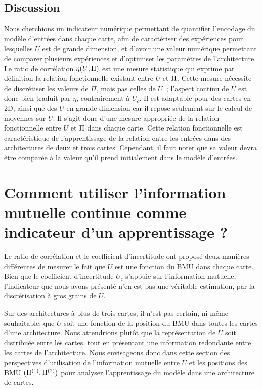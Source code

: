 \documentclass[../main]{subfiles}
\begin{document}
\subsection{Discussion}

Nous cherchions un indicateur numérique permettant de quantifier l'encodage du modèle d'entrées dans chaque carte, afin de caractériser des expériences pour lesquelles $U$ est de grande dimension, et d'avoir une valeur numérique permettant de comparer plusieurs expériences et d'optimiser les paramètres de l'architecture.
Le ratio de corrélation $\eta(U;\Pi)$ est une mesure statistique qui exprime par définition la relation fonctionnelle existant entre $U$ et $\Pi$. Cette mesure nécessite de discrétiser les valeurs de $\Pi$, mais pas celles de $U$~; l'aspect continu de $U$ est donc bien traduit par $\eta$, contrairement à $U_c$.
Il est adaptable pour des cartes en 2D, ainsi que des $U$ en grande dimension car il repose seulement sur le calcul de moyennes sur $U$.
Il s'agit donc d'une mesure appropriée de la relation fonctionnelle entre $U$ et $\Pi$ dans chaque carte.
Cette relation fonctionnelle est caractéristique de l'apprentissage de la relation entre les entrées dans des architectures de deux et trois cartes.
Cependant, il faut noter que sa valeur devra être comparée à la valeur qu'il prend initialement dans le modèle d'entrées.

\section{Comment utiliser l'information mutuelle continue comme indicateur d'un apprentissage ?}

Le ratio de corrélation et le coefficient d'incertitude ont proposé deux manières différentes de mesurer le fait que $U$ est une fonction du BMU dans chaque carte.
Bien que le coefficient d'incertitude $U_c$ s'appuie sur l'information mutuelle, l'indicateur que nous avons présenté n'en est pas une véritable estimation, par la discrétisation à gros grains de $U$.

Sur des architectures à plus de trois cartes, il n'est pas certain, ni même souhaitable, que $U$ soit une fonction de la position du BMU dans toutes les cartes d'une architecture. Nous attendrions plutôt que la représentation de $U$ soit distribuée entre les cartes, tout en présentant une information redondante entre les cartes de l'architecture.
Nous envisageons donc dans cette section des perspectives d'utilisation de l'information mutuelle entre $U$ et les positions des BMU $(\Pi^{({1})}, \Pi^{({2})})$ pour analyser l'apprentissage du modèle dans une architecture de cartes.
\end{document}
